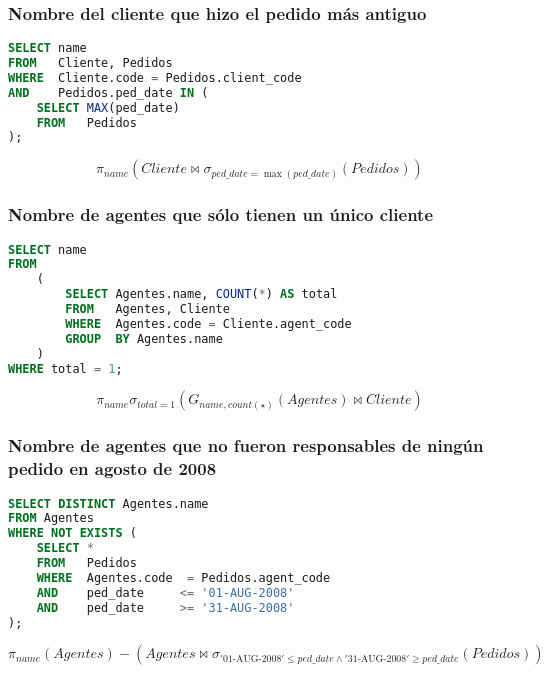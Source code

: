 \subsubsection{Nombre del cliente que hizo el pedido más antiguo}

\begin{lstlisting}[language=SQL]
SELECT name
FROM   Cliente, Pedidos
WHERE  Cliente.code = Pedidos.client_code
AND    Pedidos.ped_date IN (
	SELECT MAX(ped_date)
	FROM   Pedidos
);
\end{lstlisting}

\[\pi_{name}(Cliente\bowtie\sigma_{ped\_date=\max(ped\_date)}(Pedidos))\]

\pagebreak

\subsubsection{Nombre de agentes que sólo tienen un único cliente}

\begin{lstlisting}[language=SQL]
SELECT name
FROM
	(
		SELECT Agentes.name, COUNT(*) AS total
		FROM   Agentes, Cliente
		WHERE  Agentes.code = Cliente.agent_code
		GROUP  BY Agentes.name
	)
WHERE total = 1;
\end{lstlisting}

\[\pi_{name}\sigma_{total=1}(G_{name,count(\star)}(Agentes)\bowtie Cliente)\]

\subsubsection{Nombre de agentes que no fueron responsables de ningún pedido en agosto de 2008}

\begin{lstlisting}[language=SQL]
SELECT DISTINCT Agentes.name
FROM Agentes
WHERE NOT EXISTS (
	SELECT *
	FROM   Pedidos
	WHERE  Agentes.code  = Pedidos.agent_code
	AND    ped_date     <= '01-AUG-2008'
	AND    ped_date     >= '31-AUG-2008'
);
\end{lstlisting}

\[\pi_{name}(Agentes)-(Agentes\bowtie\sigma_{'\text{01-AUG-2008}'\leq ped\_date\land'\text{31-AUG-2008}'\geq ped\_date}(Pedidos))\]
